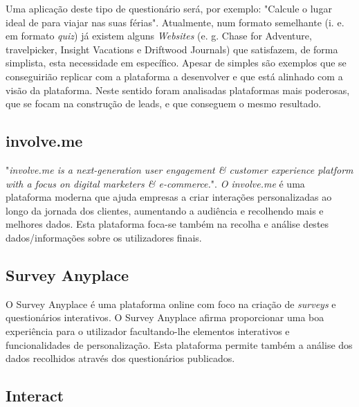 Uma aplicação deste tipo de questionário será, por exemplo: "Calcule o lugar ideal de para viajar nas suas férias". Atualmente, num formato semelhante (i. e. em formato \textit{quiz}) já existem alguns \textit{Websites} (e. g. Chase for Adventure\cite{chaseforadventure}, travelpicker\cite{travelpicker}, Insight Vacations\cite{insightvacations} e Driftwood Journals\cite{driftwoodjournals}) que satisfazem, de forma simplista, esta necessidade em específico. Apesar de simples são exemplos que se conseguirião replicar com a plataforma a desenvolver e que está alinhado com a visão da plataforma. Neste sentido foram analisadas plataformas mais poderosas, que se focam na construção de leads, e que conseguem o mesmo resultado.


\subsection{involve.me}
\label{involvemeM}


"\textit{involve.me is a next-generation user engagement \& customer experience platform with a focus on digital marketers \& e-commerce.}"\cite{involve}. \textit{O involve.me} é uma plataforma moderna que ajuda empresas a criar interações personalizadas ao longo da jornada dos clientes, aumentando a audiência e recolhendo mais e melhores dados. Esta plataforma foca-se também na recolha e análise destes dados/informações sobre os utilizadores finais.


\subsection{Survey Anyplace}
\label{surveyanyplaceM}




O Survey Anyplace é uma plataforma online com foco na criação de \textit{surveys} e questionários interativos. O Survey Anyplace afirma proporcionar uma boa experiência para o utilizador facultando-lhe elementos interativos e funcionalidades de personalização. Esta plataforma permite também a análise dos dados recolhidos através dos questionários publicados.


\subsection{Interact}
\label{interactM}


